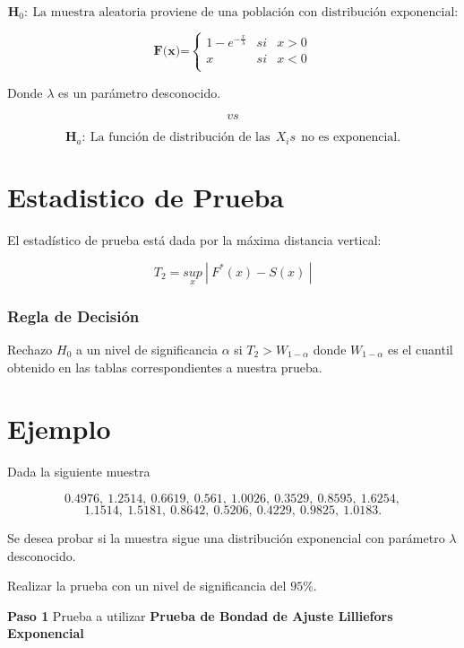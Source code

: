 \documentclass[
  a4paper,
  oneside,
  openany]{book}
\begin{document}
\[\textbf{H}_0: \ \mbox{La muestra aleatoria proviene de una población con distribución exponencial:}\]

\[
\textbf{F(x)=} \left\{
\begin{array}{lcc}
1-e^{-\frac{x}{\lambda}} & si & x > 0 \\
x & si &  x < 0 \\
\end{array}
\right.
\]

Donde \(\lambda\) es un parámetro desconocido.

\[vs\]

\[\textbf{H}_a: \ \mbox{La función de distribución de las} \ \  X_{i}s \ \  \mbox{no es exponencial.}\]

\hypertarget{estadistico-de-prueba}{%
\section{Estadistico de Prueba}\label{estadistico-de-prueba}}

El estadístico de prueba está dada por la máxima distancia vertical:

\[T_{2}=\underset{x}{sup} \ | \ F^*(x)-S(x) \ |\]

\hypertarget{regla-de-decisiuxf3n-33}{%
\subsubsection*{Regla de Decisión}\label{regla-de-decisiuxf3n-33}}


Rechazo \(H_0\) a un nivel de significancia \(\alpha\) si \(T_{2}> W_{1-\alpha}\) donde \(W_{1-\alpha}\) es el cuantil obtenido en las tablas correspondientes a nuestra prueba.

\hypertarget{ejemplo-16}{%
\section{Ejemplo}\label{ejemplo-16}}

Dada la siguiente muestra

\[0.4976,\ 1.2514,\ 0.6619,\ 0.561,\ 1.0026,\ 0.3529,\ 0.8595,\ 1.6254,\]
\[1.1514,\ 1.5181,\ 0.8642,\ 0.5206,\ 0.4229,\ 0.9825,\ 1.0183.\]

Se desea probar si la muestra sigue una distribución exponencial con parámetro \(\lambda\) desconocido.

Realizar la prueba con un nivel de significancia del \(95\%\).

\textbf{Paso 1} Prueba a utilizar \textbf{Prueba de Bondad de Ajuste Lilliefors Exponencial}
\end{document}
